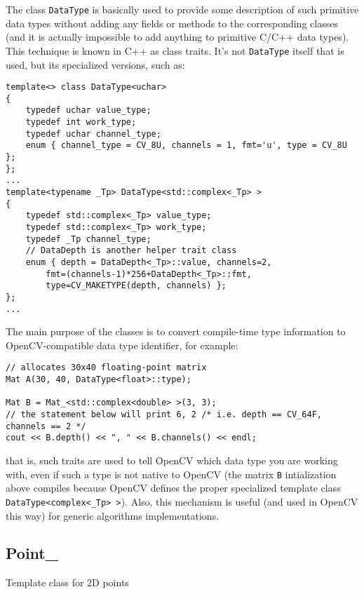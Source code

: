 The class \texttt{DataType} is basically used to provide some description of such primitive data types without adding any fields or methods to the corresponding classes (and it is actually impossible to add anything to primitive C/C++ data types). This technique is known in C++ as class traits. It's not \texttt{DataType} itself that is used, but its specialized versions, such as:

\begin{lstlisting}
template<> class DataType<uchar>
{
    typedef uchar value_type;
    typedef int work_type;
    typedef uchar channel_type;
    enum { channel_type = CV_8U, channels = 1, fmt='u', type = CV_8U };
};
...
template<typename _Tp> DataType<std::complex<_Tp> >
{
    typedef std::complex<_Tp> value_type;
    typedef std::complex<_Tp> work_type;
    typedef _Tp channel_type;
    // DataDepth is another helper trait class
    enum { depth = DataDepth<_Tp>::value, channels=2,
        fmt=(channels-1)*256+DataDepth<_Tp>::fmt,
        type=CV_MAKETYPE(depth, channels) };
};
...
\end{lstlisting}

The main purpose of the classes is to convert compile-time type information to OpenCV-compatible data type identifier, for example:

\begin{lstlisting}
// allocates 30x40 floating-point matrix
Mat A(30, 40, DataType<float>::type);

Mat B = Mat_<std::complex<double> >(3, 3);
// the statement below will print 6, 2 /* i.e. depth == CV_64F, channels == 2 */ 
cout << B.depth() << ", " << B.channels() << endl; 
\end{lstlisting}

that is, such traits are used to tell OpenCV which data type you are working with, even if such a type is not native to OpenCV (the matrix \texttt{B} intialization above compiles because OpenCV defines the proper specialized template class \texttt{DataType<complex<\_Tp> >}). Also, this mechanism is useful (and used in OpenCV this way) for generic algorithms implementations.

\subsection{Point\_}
Template class for 2D points


